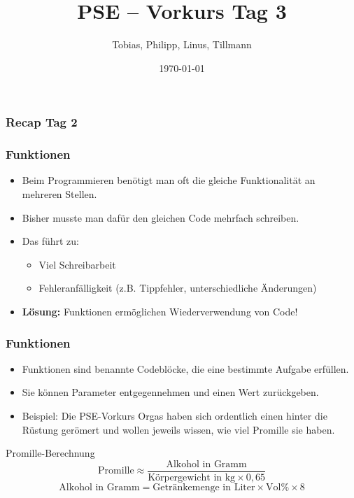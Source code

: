\documentclass{../../presentation}
\title{PSE – Vorkurs Tag 3}
\author{Tobias, Philipp, Linus, Tillmann}
\institute{FIUS - Fachgruppe Informatik Universität Stuttgart}
\date{\today}
\begin{document}
\begin{frame}
    \titlepage
\end{frame}

\begin{frame}
    \listoftodos
\end{frame}

\begin{frame}
    \frametitle{Recap Tag 2}
\end{frame}

\begin{frame}[fragile]
    \frametitle{Funktionen}
    \begin{itemize}
        \item Beim Programmieren benötigt man oft die gleiche Funktionalität an mehreren Stellen.
        \item Bisher musste man dafür den gleichen Code mehrfach schreiben.
        \item Das führt zu:
              \begin{itemize}
                  \item Viel Schreibarbeit
                  \item Fehleranfälligkeit (z.B. Tippfehler, unterschiedliche Änderungen)
              \end{itemize}
        \item \textbf{Lösung:} Funktionen ermöglichen Wiederverwendung von Code!
    \end{itemize}
\end{frame}

\begin{frame}
    \frametitle{Funktionen}
    \begin{itemize}
        \item Funktionen sind benannte Codeblöcke, die eine bestimmte Aufgabe erfüllen.
        \item Sie können Parameter entgegennehmen und einen Wert zurückgeben.
        \item Beispiel: Die PSE-Vorkurs Orgas haben sich ordentlich einen hinter die Rüstung gerömert und wollen jeweils wissen, wie viel Promille sie haben.
    \end{itemize}
    \begin{block}{Promille-Berechnung}
        \[
            \text{Promille} \approx \frac{\text{Alkohol in Gramm}}{\text{Körpergewicht in kg} \times 0{,}65}
        \]
        \[
            \text{Alkohol in Gramm} = \text{Getränkemenge in Liter} \times \text{Vol\%} \times 8
        \]
    \end{block}
\end{frame}
\end{document}
